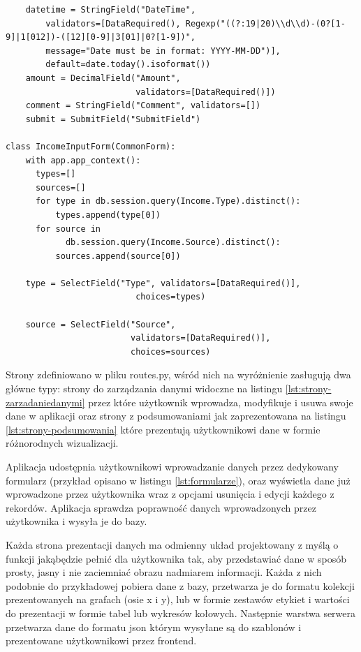 \documentclass[a4paper, 10pt, twoside, openright]{report}
\begin{document}
\begin{large}
\begin{minipage}{\textwidth}
\begin{lstlisting}
    datetime = StringField("DateTime", 
        validators=[DataRequired(), Regexp("((?:19|20)\\d\\d)-(0?[1-9]|1[012])-([12][0-9]|3[01]|0?[1-9])", 
        message="Date must be in format: YYYY-MM-DD")],
        default=date.today().isoformat())
    amount = DecimalField("Amount", 
                          validators=[DataRequired()])
    comment = StringField("Comment", validators=[])
    submit = SubmitField("SubmitField")

class IncomeInputForm(CommonForm):
    with app.app_context():
      types=[]
      sources=[]
      for type in db.session.query(Income.Type).distinct():
          types.append(type[0])
      for source in 
            db.session.query(Income.Source).distinct():
          sources.append(source[0])

    type = SelectField("Type", validators=[DataRequired()],
                          choices=types)
    
    source = SelectField("Source", 
                         validators=[DataRequired()],
                         choices=sources)\end{lstlisting}
\end{minipage}

{Strony zdefiniowano w pliku routes.py, wśród nich na wyróżnienie zasługują dwa 
główne typy: strony do zarządzania danymi widoczne na listingu 
\ref*{lst:strony-zarzadaniedanymi} przez które użytkownik wprowadza, modyfikuje 
i usuwa swoje dane w aplikacji oraz strony z podsumowaniami jak zaprezentowana 
na listingu \ref*{lst:strony-podsumowania} które prezentują użytkownikowi dane w
 formie różnorodnych wizualizacji.}

{Aplikacja udostępnia użytkownikowi wprowadzanie danych przez dedykowany 
formularz (przykład opisano w listingu \ref*{lst:formularze}), oraz wyświetla 
dane już wprowadzone przez użytkownika wraz z opcjami usunięcia i edycji każdego
z rekordów. Aplikacja sprawdza poprawność danych wprowadzonych przez 
użytkownika i wysyła je do bazy.}

{Każda strona prezentacji danych ma odmienny układ projektowany z myślą o 
funkcji jakąbędzie pełnić dla użytkownika tak, aby przedstawiać dane w sposób 
prosty, jasny i nie zaciemniać obrazu nadmiarem informacji. Każda z nich 
podobnie do przykładowej pobiera dane z bazy, przetwarza je do formatu kolekcji 
prezentowanych na grafach (osie x i y), lub w formie zestawów etykiet i wartości
do prezentacji w formie tabel lub wykresów kołowych. Następnie warstwa 
serwera przetwarza dane do formatu json \cite{JSON} którym wysyłane są do 
szablonów i prezentowane użytkownikowi przez frontend.}


\end{large}
\end{document}
